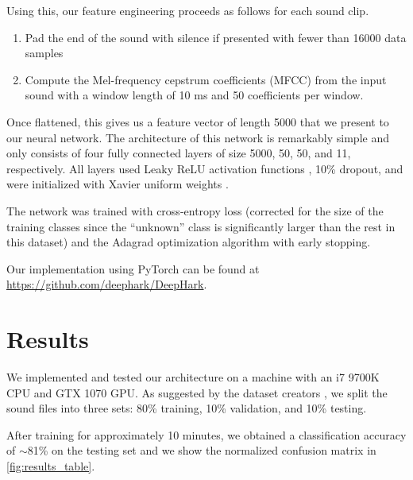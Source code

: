 \documentclass[12pt]{article}
\begin{document}
Using this, our feature engineering proceeds as follows for each sound clip.
\begin{enumerate}
	\item Pad the end of the sound with silence if presented with fewer than 16000 data samples
	\item Compute the Mel-frequency cepstrum coefficients (MFCC) from the input sound with a window length of 10 ms and 50 coefficients per window.
\end{enumerate}

Once flattened, this gives us a feature vector of length 5000 that we present to our neural network. The architecture of this network is remarkably simple and only consists of four fully connected layers of size 5000, 50, 50, and 11, respectively. All layers used Leaky ReLU activation functions \cite{xu_empirical_2015}, 10\% dropout, and were initialized with Xavier uniform weights \cite{glorot_understanding_2010}.

The network was trained with cross-entropy loss (corrected for the size of the training classes since the ``unknown'' class is significantly larger than the rest in this dataset) and the Adagrad optimization algorithm \cite{duchi_adaptive_2011} with early stopping.

Our implementation using PyTorch \cite{paszke_automatic_2017} can be found at \url{https://github.com/deephark/DeepHark}.

\section{Results}

We implemented and tested our architecture on a machine with an i7 9700K CPU and GTX 1070 GPU. As suggested by the dataset creators \cite{warden_speech_2017}, we split the sound files into three sets: 80\% training, 10\% validation, and 10\% testing.

After training for approximately 10 minutes, we obtained a classification accuracy of ${\sim}$81\% on the testing set and we show the normalized confusion matrix in \autoref{fig:results_table}.
\end{document}
